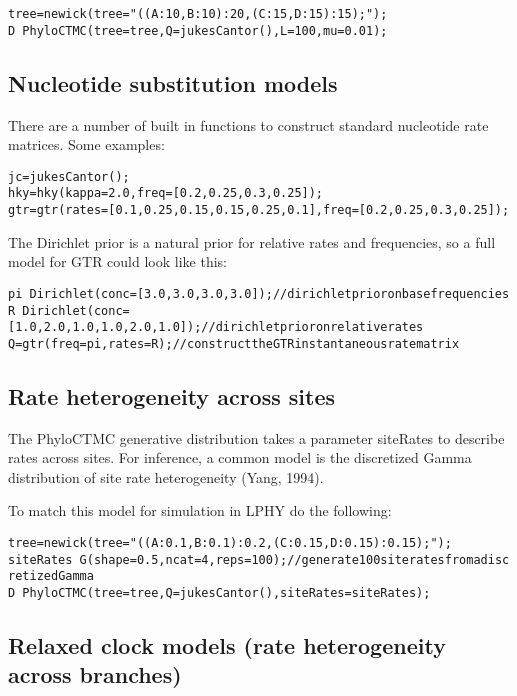 \documentclass[10pt,letterpaper,table]{article}
\begin{document}
\begin{alltt}
  tree = newick(tree="((A:10,B:10):20,(C:15,D:15):15);");
  D ~ PhyloCTMC(tree=tree, Q=jukesCantor(), L=100, mu=0.01);
\end{alltt}

\subsection*{ Nucleotide substitution models}

There are a number of built in functions to construct standard nucleotide rate matrices. Some examples:

\begin{alltt}
  jc = jukesCantor();
  hky = hky(kappa=2.0, freq=[0.2, 0.25, 0.3, 0.25]);
  gtr = gtr(rates=[0.1, 0.25, 0.15, 0.15, 0.25, 0.1], freq=[0.2, 0.25, 0.3, 0.25]);
\end{alltt}

The Dirichlet prior is a natural prior for relative rates and frequencies, so a full model for GTR could
look like this:

\begin{alltt}
  pi ~ Dirichlet(conc=[3.0,3.0,3.0,3.0]); // dirichlet prior on base frequencies
  R ~ Dirichlet(conc=[1.0, 2.0, 1.0, 1.0, 2.0, 1.0]); // dirichlet prior on relative rates
  Q = gtr(freq=pi, rates=R); // construct the GTR instantaneous rate matrix
\end{alltt}

\subsection*{ Rate heterogeneity across sites}

The PhyloCTMC generative distribution takes a parameter siteRates to describe rates across sites.
For inference, a common model is the discretized Gamma distribution of site rate heterogeneity (Yang, 1994).

To match this model for simulation in LPHY do the following:

\begin{alltt}
  tree = newick(tree="((A:0.1,B:0.1):0.2,(C:0.15,D:0.15):0.15);");
  siteRates ~ G(shape=0.5, ncat=4, reps=100); // generate 100 site rates from a discretized Gamma
  D ~ PhyloCTMC(tree=tree, Q=jukesCantor(), siteRates=siteRates);
\end{alltt}

\subsection*{  Relaxed clock models (rate heterogeneity across branches) }
\end{document}
